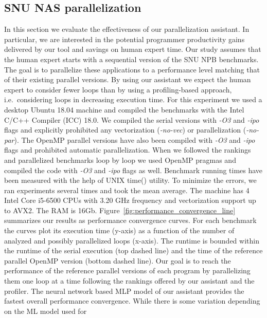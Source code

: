 \subsection{SNU NAS parallelization}
\label{assistant_snu_npb_parallelization}
\quad In this section we evaluate the effectiveness of our parallelization assistant. In particular, we are interested in the potential programmer productivity gains delivered by our tool and savings on human expert time. Our study assumes that the human expert starts with a sequential version of the SNU NPB benchmarks. The goal is to parallelize these applications to a performance level matching that of their existing parallel versions. By using our assistant we expect the human expert to consider fewer loops than by using a profiling-based approach, i.e.\ considering loops in decreasing execution time.\newline\null
\quad For this experiment we used a desktop Ubuntu 18.04 machine and compiled the benchmarks with the Intel C/C++ Compiler (ICC) 18.0. We compiled the serial versions with \textit{-O3} and \textit{-ipo} flags and explicitly prohibited any vectorization (\textit{-no-vec}) or parallelization (\textit{-no-par}). The OpenMP parallel versions have also been compiled with \textit{-O3} and \textit{-ipo} flags and prohibited automatic parallelization. When we followed the rankings and parallelized benchmarks loop by loop we used OpenMP pragmas and compiled the code with \textit{-O3} and \textit{-ipo} flags as well. Benchmark running times have been measured with the help of UNIX time() utility. To minimize the errors, we ran experiments several times and took the mean average. The machine has 4 Intel Core i5-6500 CPUs with 3.20 GHz frequency and vectorization support up to AVX2. The RAM is 16Gb.\newline\null
\quad Figure~\ref{fig:performance_convergence_line} summarizes our results as performance convergence curves. For each benchmark the curves plot its execution
time (y-axis) as a function of the number of analyzed and possibly parallelized
loops (x-axis). The runtime is bounded within the runtime of the serial
execution (top dashed line) and the time of the reference parallel OpenMP version (bottom dashed line). Our goal is to reach the performance of the reference parallel versions of each program by parallelizing them one loop at a time following the rankings offered by our assistant and the profiler. The neural network based MLP model of our assistant provides the fastest overall performance
convergence. While there is some variation depending on the ML model used for
